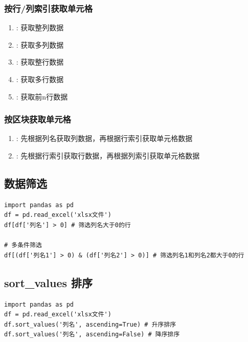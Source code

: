 \subsubsection{按行/列索引获取单元格}
\begin{enumerate}[label=\arabic*)]
    \item {}: 获取整列数据
    \item {}: 获取多列数据
    \item {}: 获取整行数据
    \item {}: 获取多行数据
    \item {}: 获取前n行数据
\end{enumerate}

\subsubsection{按区块获取单元格}
\begin{enumerate}[label=\arabic*)]
    \item {}: 先根据列名获取列数据，再根据行索引获取单元格数据
    \item {}: 先根据行索引获取行数据，再根据列索引获取单元格数据
\end{enumerate}

\subsection{数据筛选}
\begin{lstlisting}[style=demostyle,numbers=none]
import pandas as pd  
df = pd.read_excel('xlsx文件')
df[df['列名'] > 0] # 筛选列名大于0的行  

# 多条件筛选
df[(df['列名1'] > 0) & (df['列名2'] > 0)] # 筛选列名1和列名2都大于0的行
\end{lstlisting}

\subsection{sort\_values 排序}  
\begin{lstlisting}[style=demostyle,numbers=none]
import pandas as pd  
df = pd.read_excel('xlsx文件')
df.sort_values('列名', ascending=True) # 升序排序
df.sort_values('列名', ascending=False) # 降序排序
\end{lstlisting}

